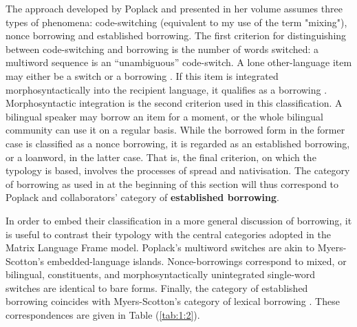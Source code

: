 The approach developed by Poplack and presented in her volume \citeyear[][]{poplack18}  assumes three types of phenomena: code-switching (equivalent to my use of the term "mixing"), nonce borrowing and established borrowing. The first criterion for distinguishing between code-switching and borrowing is the number of words switched: a multiword sequence is an ``unambiguous'' code-switch. A lone other-language item may either be a switch or a borrowing \citep[cf.][2]{poplack-comment-2011}. If this item is integrated morphosyntactically into the recipient language, it qualifies as a borrowing \citep[cf.][]{sankoff-et-al-1990}. Morphosyntactic integration is the second criterion used in this classification. A bilingual speaker may borrow an item for a moment, or the whole bilingual community can use it on a regular basis. While the borrowed form in the former case is classified as  a nonce borrowing, it is regarded as an established borrowing, or a loanword, in the latter case. That is, the final criterion, on which the typology is based, involves the processes of spread and nativisation. The category of borrowing as used in at the beginning of this section will thus correspond to Poplack and collaborators' category of \textbf{established borrowing}.

In order to embed their classification in a more general discussion of borrowing, it is useful to contrast their typology with the central categories adopted in the Matrix Language Frame model. Poplack's multiword switches are akin to Myers-Scotton's embedded-language islands. Nonce-borrowings correspond to mixed, or bilingual, constituents, and morphosyntactically unintegrated single-word switches are identical to bare forms. Finally, the category of established borrowing coincides with Myers-Scotton's category of lexical borrowing \citep[cf.][163--170]{myers-scotton-duelling-1993}. These correspondences are given in Table (\ref{tab:1:2}).

